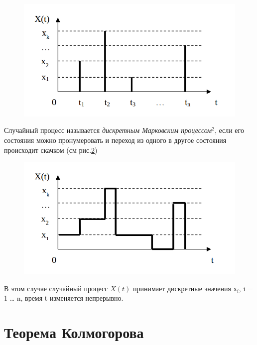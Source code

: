 \documentclass[12pt]{article}
\begin{document}
\begin{figure}[!ht]
\begin{center}
\includegraphics[scale=0.5]{1_pic.png}\caption{}\label{figure1}
\end{center}
\end{figure}

Случайный процесс называется \textit{дискретным Марковским процессом$^2$}, если его состояния можно пронумеровать и переход из одного в другое состояния происходит скачком (см рис.\ref{figure2})

\begin{figure}[!ht]
\begin{center}
\includegraphics[scale=0.5]{2_pic.png}\caption{}\label{figure2}
\end{center}
\end{figure}

В этом случае случайный процесс $X(t)$ принимает дискретные значения $х_i$, i = 1 … n, время t изменяется непрерывно.

\section{Теорема Колмогорова}
\end{document}
